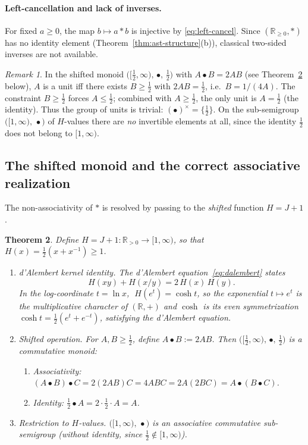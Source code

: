 \documentclass[11pt,reqno]{amsart}
\theoremstyle{plain}
\newtheorem{theorem}{Theorem}[section]
\theoremstyle{definition}
\theoremstyle{remark}
\newtheorem{remark}[theorem]{Remark} %
\newcommand{\Jcost}{J}
\newcommand{\RR}{\mathbb{R}}
\newcommand{\1}{\mathbf{1}}
\begin{document}
\paragraph{Left-cancellation and lack of inverses.} For fixed $a\ge0$, the map $b\mapsto a\ast b$ is injective by \eqref{eq:left-cancel}. Since $(\RR_{\ge0},\ast)$ has no identity element (Theorem~\ref{thm:ast-structure}(b)), classical two-sided inverses are not available.

\begin{remark}\label{rem:shifted-units}
In the shifted monoid
$\bigl([\tfrac12,\infty),\,\bullet,\,\tfrac12\bigr)$ with
$A\bullet B=2AB$ (see Theorem~\ref{thm:shifted-monoid} below),
$A$ is a unit iff there exists $B\ge\tfrac12$ with
$2AB=\tfrac12$, i.e.\ $B=1/(4A)$. The constraint
$B\ge\tfrac12$ forces $A\le\tfrac12$; combined with
$A\ge\tfrac12$, the only unit is $A=\tfrac12$ (the identity).
Thus the group of units is trivial: $(\bullet)^{\times}=\{\tfrac12\}$.
On the sub-semigroup $\bigl([1,\infty),\,\bullet\bigr)$ of
$H$-values there are \emph{no} invertible elements at all, since
the identity $\tfrac12$ does not belong to $[1,\infty)$.
\end{remark}

\subsection{The shifted monoid and the correct associative realization}
\label{ssec:shifted} The non-associativity of $\ast$ is resolved by passing to the
\emph{shifted} function $H=\Jcost+1$. \begin{theorem}\label{thm:shifted-monoid}
Define $H=\Jcost+1:\RR_{>0}\to[1,\infty)$, so that
$H(x)=\tfrac12(x+x^{-1})\ge1$.
\begin{enumerate}[nosep,label=\textup{(\alph*)}]
\item d'Alembert kernel identity. The d'Alembert equation~\eqref{eq:dalembert} states \[ H(xy)+H(x/y)=2\,H(x)\,H(y). \] In the log-coordinate $t=\ln x$, $\;H(e^t)=\cosh t$, so the exponential $t\mapsto e^t$ is the multiplicative character of $(\RR,+)$ and $\cosh$ is its even symmetrization $\cosh t=\tfrac12(e^t+e^{-t})$, satisfying the d'Alembert equation.
\item Shifted operation. For $A,B\ge\tfrac12$, define $A\bullet B:=2AB$. Then $\bigl([\tfrac12,\infty),\,\bullet,\,\tfrac12\bigr)$ is a commutative monoid:
\begin{enumerate}[nosep,label=\textup{(\roman*)},leftmargin=*]
\item \emph{Associativity:} $(A\bullet B)\bullet C = 2(2AB)C = 4ABC = 2A(2BC) = A\bullet(B\bullet C)$.
\item \emph{Identity:} $\tfrac12\bullet A = 2\cdot\tfrac12\cdot A = A$.
\end{enumerate}
\item Restriction to $H$-values. $\bigl([1,\infty),\,\bullet\bigr)$ is an associative commutative sub-semigroup (without identity, since $\tfrac12\notin[1,\infty)$).
\end{enumerate}
\end{theorem}
\end{document}
